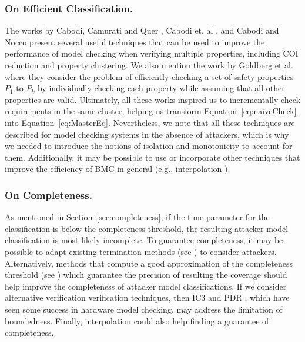 {\subsubsection{On Efficient Classification.} 
The works by Cabodi, Camurati and Quer \cite{GraphLabelingForEfficientCOIComputation}, Cabodi et. al \cite{ToSplitOrToGroup}, and Cabodi and Nocco \cite{OptimizedModelCheckingOfMultipleProperties} present several useful techniques that can be used to improve the performance of model checking when verifying multiple properties, including COI reduction and property clustering. We also mention the work by Goldberg et al. \cite{JustAssume} where they consider the problem of efficiently checking a set of safety properties $P_1$ to $P_k$ by individually checking each property while assuming that all other properties are valid. Ultimately, all these works inspired us to incrementally check requirements in the same cluster, helping us transform Equation~\ref{eq:naiveCheck} into Equation~\ref{eq:MasterEq}. Nevertheless, we note that all these techniques are described for model checking systems in the absence of attackers, which is why we needed to introduce the notions of isolation and monotonicity to account for them. Additionally, it may be possible to use or incorporate other techniques that improve the efficiency of BMC in general (e.g., interpolation \cite{Interpolation}).

\subsubsection{On Completeness.} As mentioned in Section~\ref{sec:completeness}, if the time parameter for the classification is below the {completeness threshold}, the resulting attacker model classification is most likely {incomplete}. To guarantee completeness, it may be possible to adapt existing termination methods (see \cite{ProvingMorePropertiesWithBMC}) to consider attackers. Alternatively, methods that compute a good approximation of the completeness threshold (see \cite{EfficientComputationOfRecurrenceDiameters}) which guarantee the precision of resulting the coverage should help improve the completeness of attacker model classifications. If we consider alternative verification verification techniques, then IC3 \cite{IC3,IC32} and PDR \cite{IC3}, which have seen some success in hardware model checking, may address the limitation of boundedness. Finally, interpolation \cite{Interpolation} could also help finding a guarantee of completeness. 

}
